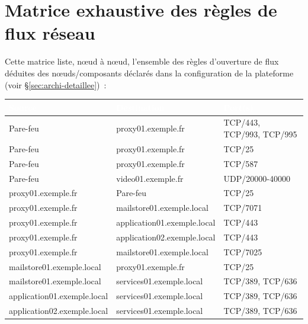 \documentclass[11pt,a4paper]{report}
\newcommand{\tblhead}[1]{\textcolor{white}{\textbf{#1}}}
\begin{document}
\chapter{Matrice exhaustive des règles de flux réseau}
Cette matrice liste, nœud à nœud, l'ensemble des règles d'ouverture de flux déduites des nœuds/composants déclarés dans la configuration de la plateforme (voir \S\ref{sec:archi-detaillee})~:

\begin{longtable}{|p{5cm}|p{5cm}|p{5cm}|}
\hline
\rowcolor{primary}\tblhead{Source} & \tblhead{Destination} & \tblhead{Port(s)} \\
\hline
\endhead
Pare-\allowbreak{}feu & proxy01.\allowbreak{}exemple.\allowbreak{}fr & TCP/443, TCP/993, TCP/995 \\
\hline
Pare-\allowbreak{}feu & proxy01.\allowbreak{}exemple.\allowbreak{}fr & TCP/25 \\
\hline
Pare-\allowbreak{}feu & proxy01.\allowbreak{}exemple.\allowbreak{}fr & TCP/587 \\
\hline
Pare-\allowbreak{}feu & video01.\allowbreak{}exemple.\allowbreak{}fr & UDP/20000-\allowbreak{}40000 \\
\hline
proxy01.\allowbreak{}exemple.\allowbreak{}fr & Pare-\allowbreak{}feu & TCP/25 \\
\hline
proxy01.\allowbreak{}exemple.\allowbreak{}fr & mailstore01.\allowbreak{}exemple.\allowbreak{}local & TCP/7071 \\
\hline
proxy01.\allowbreak{}exemple.\allowbreak{}fr & application01.\allowbreak{}exemple.\allowbreak{}local & TCP/443 \\
\hline
proxy01.\allowbreak{}exemple.\allowbreak{}fr & application02.\allowbreak{}exemple.\allowbreak{}local & TCP/443 \\
\hline
proxy01.\allowbreak{}exemple.\allowbreak{}fr & mailstore01.\allowbreak{}exemple.\allowbreak{}local & TCP/7025 \\
\hline
mailstore01.\allowbreak{}exemple.\allowbreak{}local & proxy01.\allowbreak{}exemple.\allowbreak{}fr & TCP/25 \\
\hline
mailstore01.\allowbreak{}exemple.\allowbreak{}local & services01.\allowbreak{}exemple.\allowbreak{}local & TCP/389, TCP/636 \\
\hline
application01.\allowbreak{}exemple.\allowbreak{}local & services01.\allowbreak{}exemple.\allowbreak{}local & TCP/389, TCP/636 \\
\hline
application02.\allowbreak{}exemple.\allowbreak{}local & services01.\allowbreak{}exemple.\allowbreak{}local & TCP/389, TCP/636 \\

\end{longtable}
\end{document}
